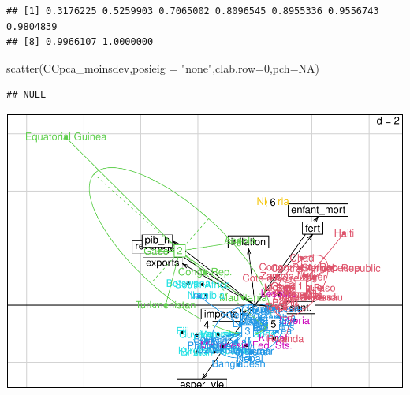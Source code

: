 \documentclass[
]{article}
\newenvironment{Shaded}{}{}
\newcommand{\AttributeTok}[1]{#1}
\newcommand{\ConstantTok}[1]{#1}
\newcommand{\DecValTok}[1]{#1}
\newcommand{\FunctionTok}[1]{#1}
\newcommand{\NormalTok}[1]{#1}
\newcommand{\SpecialCharTok}[1]{\textcolor[rgb]{0.00,0.50,0.50}{#1}}
\newcommand{\StringTok}[1]{\textcolor[rgb]{0.00,0.50,0.50}{#1}}
\begin{document}
\begin{verbatim}
## [1] 0.3176225 0.5259903 0.7065002 0.8096545 0.8955336 0.9556743 0.9804839
## [8] 0.9966107 1.0000000
\end{verbatim}

\begin{Shaded}
\begin{Highlighting}[]
\FunctionTok{scatter}\NormalTok{(CCpca\_moinsdev,}\AttributeTok{posieig =} \StringTok{"none"}\NormalTok{,}\AttributeTok{clab.row=}\DecValTok{0}\NormalTok{,}\AttributeTok{pch=}\ConstantTok{NA}\NormalTok{)}
\end{Highlighting}
\end{Shaded}

\begin{verbatim}
## NULL
\end{verbatim}

\begin{Shaded}
\end{Shaded}

\includegraphics{Projet_files/figure-latex/unnamed-chunk-40-1.pdf}
\end{document}
